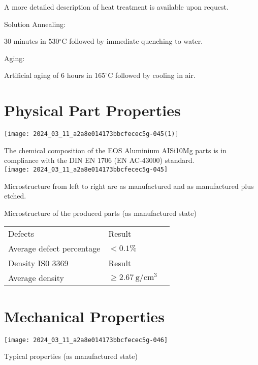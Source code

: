 \documentclass[10pt]{article}
\begin{document}
A more detailed description of heat treatment is available upon request.

Solution Annealing:

30 minutes in $530{ }^{\circ} \mathrm{C}$ followed by immediate quenching to water.

Aging:

Artificial aging of 6 hours in $165^{\circ} \mathrm{C}$ followed by cooling in air.

\section*{Physical Part Properties}
\begin{center}
\texttt{[image: 2024\_03\_11\_a2a8e014173bbcfecec5g-045(1)]}
\end{center}

The chemical composition of the EOS Aluminium AISi10Mg parts is in compliance with the DIN EN 1706 (EN AC-43000) standard.\\
\texttt{[image: 2024\_03\_11\_a2a8e014173bbcfecec5g-045]}

Microstructure from left to right are as manufactured and as manufactured plus etched.

Microstructure of the produced parts (as manufactured state)

\begin{center}
\begin{tabular}{llc}
\hline
Defects & Result \\
Average defect percentage & $<0.1 \%$ \\
Density IS0 3369 & Result \\
\hline
Average density & $\geq 2.67 \mathrm{~g} / \mathrm{cm}^{3}$ \\
\hline
\end{tabular}
\end{center}

\section*{Mechanical Properties}
\begin{center}
\texttt{[image: 2024\_03\_11\_a2a8e014173bbcfecec5g-046]}
\end{center}

Typical properties (as manufactured state)
\end{document}
